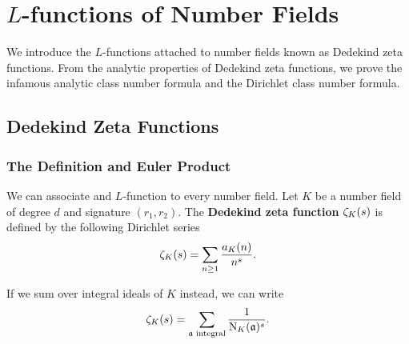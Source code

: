 \chapter{\texorpdfstring{$L$}{L}-functions of Number Fields}
  We introduce the $L$-functions attached to number fields known as Dedekind zeta functions. From the analytic properties of Dedekind zeta functions, we prove the infamous analytic class number formula and the Dirichlet class number formula.
  \section{Dedekind Zeta Functions}
    \subsection*{The Definition and Euler Product}
      We can associate and $L$-function to every number field. Let $K$ be a number field of degree $d$ and signature $(r_{1},r_{2})$. The \textbf{Dedekind zeta function} $\zeta_{K}(s)$ is defined by the following Dirichlet series
      \[
        \zeta_{K}(s) = \sum_{n \ge 1}\frac{a_{K}(n)}{n^{s}}.
      \]

      \begin{remark}
        If we sum over integral ideals of $K$ instead, we can write
        \[
          \zeta_{K}(s) = \sum_{\text{$\mathfrak{a}$ integral}}\frac{1}{\operatorname{\mathrm{N}}_{K}(\mathfrak{a})^{s}}.
        \]
      \end{remark}

